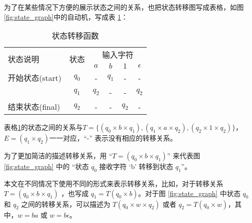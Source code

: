 \begin{remark}
    为了在某些情况下方便的展示状态之间的关系，也把状态转移图写成表格\cite{book1}，如图\ref{fig:state_graph}中的自动机，写成表 \ref{tab:sample}：
\begin{table}[!htbp]
    \caption{状态转移函数}
    \label{tab:sample}
    \centering
    \small%
    \setlength{\tabcolsep}{6pt}%
    \renewcommand{\arraystretch}{1.2}%
    \begin{tabular}{lccccc}
        \toprule%
        \multirow{2}{*}{状态说明} & \multirow{2}{*}{状态} & \multicolumn{4}{c}{输入字符} \\
		\cline{3-6}      &    & $a$ & $b$ & $1$ & ${\epsilon}$ \\
        \midrule%
        开始状态(start)  & $q_0$ & -     & $q_1$  &      - &     -    \\
                        & $q_1$ & $q_2$ &    -   &    -   &    $q_2$ \\
        结束状态(final) & $q_2$ &   -   & -      & $q_2$  &    -     \\
        \bottomrule%
    \end{tabular}
\end{table}
\end{remark}


表格\ref{tab:sample}的状态之间的关系与$T=\{(q_0 \times b \times q_1),(q_1\times a \times q_2),(q_2\times 1 \times q_2)\}$，$E=(q_1 \times q_2)$一一对应，“\mbox{-}” 表示没有相应的转移关系。%

\begin{remark}[转移关系的表示]
    为了更加简洁的描述转移关系，用 “$T=(q_0 \times b \times q_1)$” 来代表图 \ref{fig:state_graph} 中的 “状态 $q_0$ 接收字符 ‘b’ 转移到状态 $q_1$”。
\end{remark}

\begin{remark}
    本文在不同情况下使用不同的形式来表示转移关系，比如，对于转移关系 $T=(q_0 \times b \times q_1)$ ，也写成 $ q_1 = T(q_0 \times b) $。对于图 \ref{fig:state_graph} 中状态 $q_0$ 和 $q_2$ 之间的转移关系，可以描述为 $T(q_0\times w \times q_2)$ 或者 $q_2=T(q_0 \times w)$，其中，$w=ba$ 或 $w=b\epsilon$。
\end{remark}


